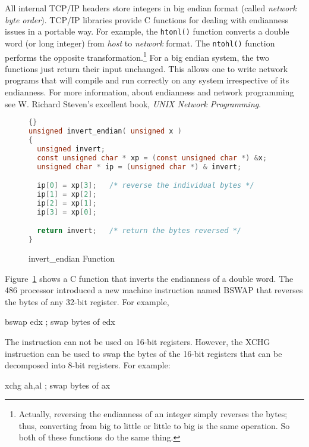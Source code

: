 All internal TCP/IP headers store integers in big endian format
(called \emph{network byte order}). TCP/IP libraries provide C
functions for dealing with endianness issues in a portable way.  For
example, the \lstinline|htonl()| function converts a double word (or
long integer) from \emph{host} to \emph{network} format. The
\lstinline|ntohl()| function performs the opposite
transformation.\footnote{Actually, reversing the endianness of an
integer simply reverses the bytes; thus, converting from big to little
or little to big is the same operation. So both of these functions do
the same thing.} For a big endian system, the two functions just
return their input unchanged. This allows one to write network
programs that will compile and run correctly on any system
irrespective of its endianness. For more information, about endianness
and network programming see W. Richard Steven's excellent book, 
\emph{UNIX Network Programming}.

\begin{figure}[t]
\begin{lstlisting}[frame=tlrb, language=C]{}
unsigned invert_endian( unsigned x )
{
  unsigned invert;
  const unsigned char * xp = (const unsigned char *) &x;
  unsigned char * ip = (unsigned char *) & invert;

  ip[0] = xp[3];   /* reverse the individual bytes */
  ip[1] = xp[2];
  ip[2] = xp[1];
  ip[3] = xp[0];

  return invert;   /* return the bytes reversed */
}
\end{lstlisting}
\caption{invert\_endian Function \label{fig:invertEndian}}
\end{figure}

Figure~\ref{fig:invertEndian} shows a C function that inverts the
endianness of a double word. The 486 processor introduced a new
machine instruction named {\code BSWAP}  that reverses
the bytes of any 32-bit register. For example,
\begin{AsmCodeListing}[frame=none,numbers=none]
      bswap   edx          ; swap bytes of edx
\end{AsmCodeListing}
The instruction can not be used on 16-bit registers. However, the
{\code XCHG}  instruction can be used to swap the bytes of
the 16-bit registers that can be decomposed into 8-bit registers. For
example:
\begin{AsmCodeListing}[frame=none,numbers=none]
      xchg    ah,al        ; swap bytes of ax
\end{AsmCodeListing}

